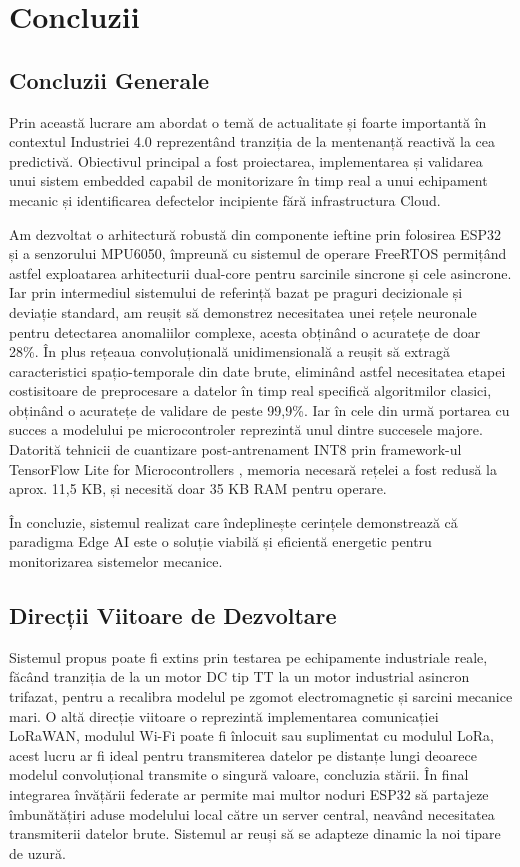 \chapter{Concluzii}
\section{Concluzii Generale}
	
	Prin această lucrare am abordat o temă de actualitate și foarte importantă în contextul Industriei 4.0 reprezentând tranziția de la mentenanță reactivă la cea predictivă. Obiectivul principal a fost proiectarea, implementarea și validarea unui sistem embedded capabil de monitorizare în timp real a unui echipament mecanic și identificarea defectelor incipiente fără infrastructura Cloud.
	
	Am dezvoltat o arhitectură robustă din componente ieftine prin folosirea ESP32 și a senzorului MPU6050, împreună cu sistemul de operare FreeRTOS permițând astfel exploatarea arhitecturii dual-core pentru sarcinile sincrone și cele asincrone. Iar prin intermediul sistemului de referință bazat pe praguri decizionale și deviație standard, am reușit să demonstrez necesitatea unei rețele neuronale pentru detectarea anomaliilor complexe, acesta obținând o acuratețe de doar 28\%. În plus rețeaua convoluțională unidimensională a reușit să extragă caracteristici spațio-temporale din date brute, eliminând astfel necesitatea etapei costisitoare de preprocesare a datelor în timp real specifică algoritmilor clasici, obținând o acuratețe de validare de peste 99,9\%. Iar în cele din urmă portarea cu succes a modelului pe microcontroler reprezintă unul dintre succesele majore. Datorită tehnicii de cuantizare post-antrenament INT8 prin framework-ul TensorFlow Lite for Microcontrollers \cite{tensorflow:tflitemicro_github}, memoria necesară rețelei a fost redusă la aprox. 11,5 KB, și necesită doar 35 KB RAM pentru operare.
	
	În concluzie, sistemul realizat care îndeplinește cerințele demonstrează că paradigma Edge AI este o soluție viabilă și eficientă energetic pentru monitorizarea sistemelor mecanice.
	
\section{Direcții Viitoare de Dezvoltare}
	
	Sistemul propus poate fi extins prin testarea pe echipamente industriale reale, făcând tranziția de la un motor DC tip TT la un motor industrial asincron trifazat, pentru a recalibra modelul pe zgomot electromagnetic și sarcini mecanice mari. O altă direcție viitoare o reprezintă implementarea comunicației LoRaWAN, modulul Wi-Fi poate fi înlocuit sau suplimentat cu modulul LoRa, acest lucru ar fi ideal pentru transmiterea datelor pe distanțe lungi deoarece modelul convoluțional transmite o singură valoare, concluzia stării. În final integrarea învățării federate ar permite mai multor noduri ESP32 să partajeze îmbunătățiri aduse modelului local către un server central, neavând necesitatea transmiterii datelor brute. Sistemul ar reuși să se adapteze dinamic la noi tipare de uzură.
	